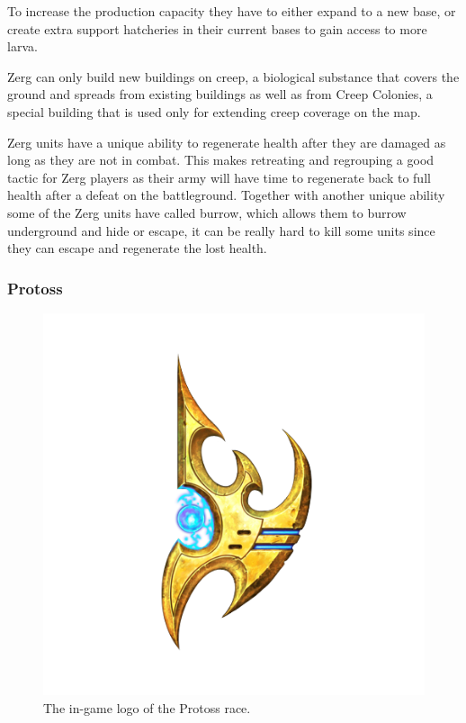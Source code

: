To increase the production capacity they have to either expand to a new base, or create extra support hatcheries in their current bases to gain access to more larva.

Zerg can only build new buildings on creep, a biological substance that covers the ground and spreads from existing buildings as well as from Creep Colonies, a special building that is used only for extending creep coverage on the map.

Zerg units have a unique ability to regenerate health after they are damaged as long as they are not in combat. This makes retreating and regrouping a good tactic for Zerg players as their army will have time to regenerate back to full health after a defeat on the battleground. Together with another unique ability some of the Zerg units have called burrow, which allows them to burrow underground and hide or escape, it can be really hard to kill some units since they can escape and regenerate the lost health. 

\subsubsection{Protoss}
\begin{figure}[h!tb]
\centering
\includegraphics[scale=0.3]{graphics/protossicon.png}
\caption{The in-game logo of the Protoss race.\cite{protosslogo}}
\end{figure}

